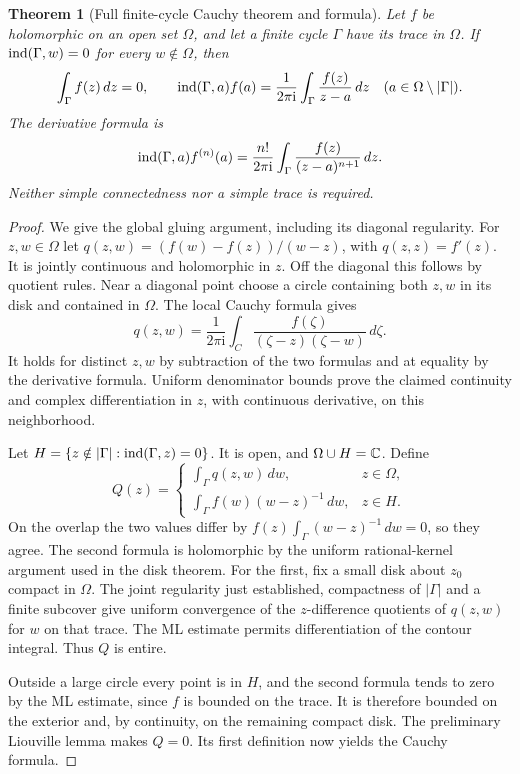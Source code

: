 \documentclass[11pt,a4paper,openany]{book}
\newtheorem{theorem}{Theorem}[chapter]
\theoremstyle{definition}
\theoremstyle{remark}\newtheorem{remark}[theorem]{Remark}
\newcommand{\dd}{\,d}\newcommand{\iu}{\mathrm i}
\newcommand{\family}[1]{}
\begin{document}
\begin{theorem}[Full finite-cycle Cauchy theorem and formula]\family{D12.04.05}\label{d12:04-05}
Let \(f\) be holomorphic on an open set \(\Omega\), and let a finite
cycle \(\Gamma\) have its trace in \(\Omega\). If
\(\operatorname{ind}(\Gamma,w)=0\) for every \(w\notin\Omega\), then
\[
 \int_\Gamma f(z)\dd z=0,\qquad
 \ind(\Gamma,a)f(a)=\frac1{2\pi\iu}
       \int_\Gamma\frac{f(z)}{z-a}\dd z\quad(a\in\Omega\setminus|\Gamma|).
\]
The derivative formula is
\[
 \ind(\Gamma,a)f^{(n)}(a)
 =\frac{n!}{2\pi\iu}\int_\Gamma
            \frac{f(z)}{(z-a)^{n+1}}\dd z.
\]
Neither simple connectedness nor a simple trace is required.
\end{theorem}
\begin{proof}
We give the global gluing argument, including its diagonal regularity.
For \(z,w\in\Omega\) let
\(q(z,w)=(f(w)-f(z))/(w-z)\), with \(q(z,z)=f'(z)\).
It is jointly continuous and holomorphic in \(z\).
Off the diagonal this follows by quotient rules.
Near a diagonal point choose a circle containing both \(z,w\) in its
disk and contained in \(\Omega\). The local Cauchy formula gives
\[
 q(z,w)=\frac1{2\pi\iu}\int_C
        \frac{f(\zeta)}{(\zeta-z)(\zeta-w)}\dd\zeta .
\]
It holds for distinct \(z,w\) by subtraction of the two formulas and
at equality by the derivative formula. Uniform denominator bounds
prove the claimed continuity and complex differentiation in \(z\),
with continuous derivative, on this neighborhood.

Let \(H=\{z\notin|\Gamma|:\operatorname{ind}(\Gamma,z)=0\}\).
It is open, and \(\Omega\cup H=\mathbb C\).
Define
\[
 Q(z)=
 \begin{cases}
 \displaystyle\int_\Gamma q(z,w)\dd w,&z\in\Omega,\\[3pt]
 \displaystyle\int_\Gamma f(w)(w-z)^{-1}\dd w,&z\in H .
 \end{cases}
\]
On the overlap the two values differ by
\(f(z)\int_\Gamma(w-z)^{-1}\dd w=0\), so they agree.
The second formula is holomorphic by the uniform rational-kernel
argument used in the disk theorem.
For the first, fix a small disk about \(z_0\) compact in \(\Omega\).
The joint regularity just established, compactness of \(|\Gamma|\)
and a finite subcover give uniform convergence of the \(z\)-difference
quotients of \(q(z,w)\) for \(w\) on that trace.
The ML estimate permits differentiation of the contour integral.
Thus \(Q\) is entire.

Outside a large circle every point is in \(H\), and the second formula
tends to zero by the ML estimate, since \(f\) is bounded on the trace.
It is therefore bounded on the exterior and, by continuity, on the
remaining compact disk. The preliminary Liouville lemma makes \(Q=0\).
Its first definition now yields the Cauchy formula.


\end{proof}
\end{document}
